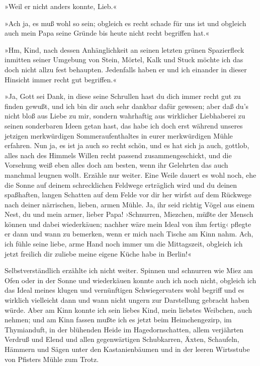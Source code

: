 »Weil er nicht anders konnte, Lieb.«

»Ach ja, es muß wohl so sein; obgleich es recht schade für uns ist
und obgleich auch mein Papa seine Gründe bis heute nicht recht
begriffen hat.«

»Hm, Kind, nach dessen Anhänglichkeit an seinen letzten grünen
Spazierfleck inmitten seiner Umgebung von Stein, Mörtel, Kalk und
Stuck möchte ich das doch nicht allzu fest behaupten. Jedenfalls
haben er und ich einander in dieser Hinsicht immer recht gut
begriffen.«

»Ja, Gott sei Dank, in diese seine Schrullen hast du dich immer
recht gut zu finden gewußt, und ich bin dir auch sehr dankbar dafür
gewesen; aber daß du's nicht bloß aus Liebe zu mir, sondern
wahrhaftig aus wirklicher Liebhaberei zu seinen sonderbaren Ideen
getan hast, das habe ich doch erst während unseres jetzigen
merkwürdigen Sommeraufenthaltes in eurer merkwürdigen Mühle
erfahren. Nun ja, es ist ja auch so recht schön, und es hat sich ja
auch, gottlob, alles nach des Himmels Willen recht passend
zusammengeschickt, und die Vorsehung weiß eben alles doch am
besten, wenn ihr Gelehrten das auch manchmal leugnen wollt. Erzähle
nur weiter. Eine Weile dauert es wohl noch, ehe die Sonne auf
deinem schrecklichen Feldwege erträglich wird und du deinen
spaßhaften, langen Schatten auf dem Felde vor dir her wirfst auf
dem Rückwege nach deiner närrischen, lieben, armen Mühle. Ja, ihr
seid richtig Vögel aus einem Nest, du und mein armer, lieber Papa!
›Schnurren, Miezchen, müßte der Mensch können und dabei
wiederkäuen; nachher wäre mein Ideal von ihm fertig‹ pflegte er
dann und wann zu bemerken, wenn er mich nach Tische am Kinn nahm.
Ach, ich fühle seine liebe, arme Hand noch immer um die
Mittagszeit, obgleich ich jetzt freilich dir zuliebe meine eigene
Küche habe in Berlin!«

Selbstverständlich erzählte ich nicht weiter. Spinnen und schnurren
wie Miez am Ofen oder in der Sonne und wiederkäuen konnte auch ich
noch nicht, obgleich ich das Ideal meines klugen und vernünftigen
Schwiegervaters wohl begriff und es wirklich vielleicht dann und
wann nicht ungern zur Darstellung gebracht haben würde. Aber am
Kinn konnte ich sein liebes Kind, mein liebstes Weibchen, auch
nehmen; und am Kinn fassen mußte ich es jetzt beim Heimchengezirp,
im Thymianduft, in der blühenden Heide im Hagedornschatten, allem
verjährten Verdruß und Elend und allen gegenwärtigen Schubkarren,
Äxten, Schaufeln, Hämmern und Sägen unter den Kastanienbäumen und
in der leeren Wirtsstube von Pfisters Mühle zum Trotz.

